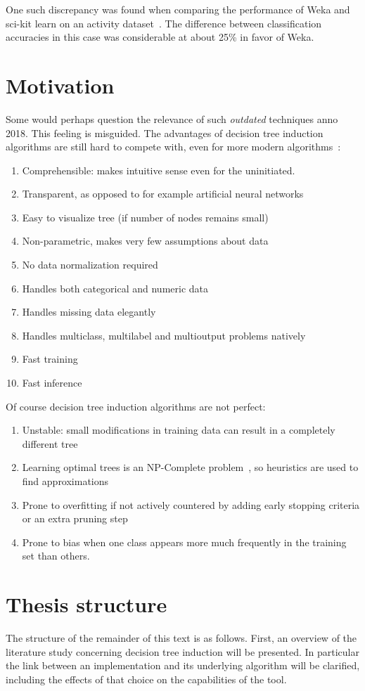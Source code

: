 One such discrepancy was found when comparing the performance of Weka and sci-kit learn on an activity dataset~\cite{problematic_dataset}. The difference between classification accuracies in this case was considerable at about 25\% in favor of Weka.

\section{Motivation}
Some would perhaps question the relevance of such \emph{outdated} techniques anno 2018. This feeling is misguided. The advantages of decision tree induction algorithms are still hard to compete with, even for more modern algorithms~\cite{scikit-learn, murthy1998automatic, kotsiantis2007supervised}:

\begin{enumerate}
    \item Comprehensible: makes intuitive sense even for the uninitiated.
    \item Transparent, as opposed to for example artificial neural networks
    \item Easy to visualize tree (if number of nodes remains small)
    \item Non-parametric, makes very few assumptions about data
    \item No data normalization required
    \item Handles both categorical and numeric data
    \item Handles missing data elegantly %
    \item Handles multiclass, multilabel and multioutput problems natively
    \item Fast training
    \item Fast inference
\end{enumerate}

Of course decision tree induction algorithms are not perfect:
\begin{enumerate}
    \item Unstable: small modifications in training data can result in a completely different tree
    \item Learning optimal trees is an NP-Complete problem~\cite{npcomplete}, so heuristics are used to find approximations
    \item Prone to overfitting if not actively countered by adding early stopping criteria or an extra pruning step
    \item Prone to bias when one class appears more much frequently in the training set than others.
\end{enumerate}


\section{Thesis structure}
The structure of the remainder of this text is as follows. First, an overview of the literature study concerning decision tree induction will be presented. In particular the link between an implementation and its underlying algorithm will be clarified, including the effects of that choice on the capabilities of the tool.
